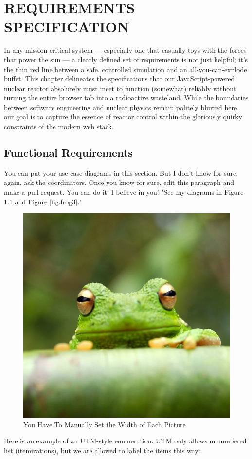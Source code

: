 \chapter{REQUIREMENTS SPECIFICATION}

In any mission-critical system — especially one that casually toys with the forces that power the sun — a clearly defined set of requirements is not just helpful; it’s the thin red line between a safe, controlled simulation and an all-you-can-explode buffet. This chapter delineates the specifications that our JavaScript-powered nuclear reactor absolutely must meet to function (somewhat) reliably without turning the entire browser tab into a radioactive wasteland. While the boundaries between software engineering and nuclear physics remain politely blurred here, our goal is to capture the essence of reactor control within the gloriously quirky constraints of the modern web stack.

\section{Functional Requirements}


You can put your use-case diagrams in this section.
But I don't know for sure, again, ask the coordinators.
Once you know for sure, edit this paragraph and make a pull request.
You can do it, I believe in you!
"See my diagrams in Figure \ref{fig:frog2} and Figure \ref{fig:frog3}."

\begin{figure}[hb]
\centering
\includegraphics[width=0.25\linewidth]{img/frog.jpg}
\caption{\label{fig:frog2}You Have To Manually Set the Width of Each Picture}
\end{figure}


Here is an example of an UTM-style enumeration.
UTM only allows unnumbered list (itemizations), but we are allowed to label the items this way:

